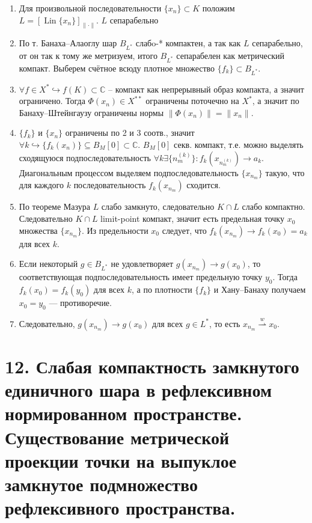 \documentclass[10pt,a4paper]{article}
\newcommand{\CC}{\mathbb C}
\begin{document}
	\begin{enumerate}
		\item Для произвольной последовательности $\{x_n\}\subset K$ положим
		$L=[\operatorname{Lin}\{x_n\}]_{\|\cdot\|}$.
		$L$ сепарабельно

		\item По т. Банаха--Алаоглу шар $B_{L^*}$ слабo-* компактен, а так как $L$ сепарабельно, от он так к тому же метризуем, итого $B_{L^*}$ сепарабелен как метрический компакт.
		Выберем счётное всюду плотное множество $\{f_k\}\subset B_{L^*}$.

		\item $\forall f \in X^* \hookrightarrow f(K) \subset \CC$ -- компакт как непрерывный образ компакта, а значит ограничено. Тогда $\Phi(x_n) \in X^{**}$ ограничены поточечно на $X^*$, а значит по Банаху--Штейнгаузу ограничены нормы $\|\Phi(x_n)\| = \|x_n\|$.

		\item $\{f_k\}$ и $\{x_n\}$ ограничены по 2 и 3 соотв., значит $\forall k \hookrightarrow \{f_k(x_n)\} \subseteq B_M[0] \subset \CC$. $B_M[0]$ секв. компакт, т.е. можно выделять сходящуюся подпоследовательность $\forall k \exists \{n_m^{(k)}\}: f_k(x_{n_m^{(k)}}) \rightarrow a_k$. Диагональным процессом выделяем подпоследовательность $\{x_{n_m}\}$ такую, что для каждого $k$ последовательность $f_k(x_{n_m})$ сходится.

		\item По теореме Мазура $L$ слабо замкнуто, следовательно $K\cap L$ слабо компактно. Следовательно $K\cap L$ limit-point компакт, значит есть предельная точку $x_0$ множества $\{x_{n_m}\}$. Из предельности $x_0$ следует, что
		$f_k(x_{n_m})\to f_k(x_0) = a_k$ для всех $k$.

		\item Если некоторый $g\in B_{L^*}$ не удовлетворяет
		$g(x_{n_m})\to g(x_0)$, то соответствующая подпоследовательность имеет предельную точку $y_0$.
		Тогда $f_k(x_0)=f_k(y_0)$ для всех $k$, а по плотности $\{f_k\}$ и Хану--Банаху получаем $x_0=y_0$ — противоречие.

		\item Следовательно,
		$g(x_{n_m})\to g(x_0)$ для всех $g\in L^*$, то есть
		$x_{n_m}\stackrel{w}{\rightharpoonup} x_0$.
	\end{enumerate}

	\section*{12. Слабая компактность замкнутого единичного шара в рефлексивном нормированном пространстве. Существование метрической проекции точки на выпуклое замкнутое подмножество рефлексивного пространства.}
\end{document}
